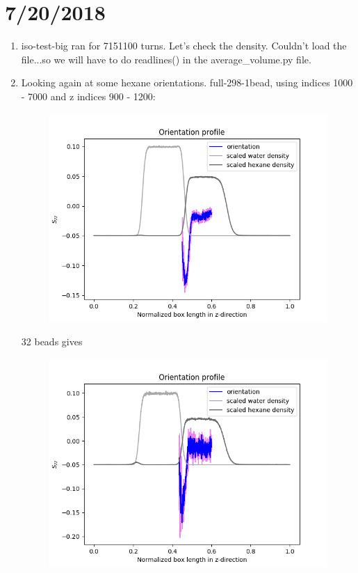 \documentclass[12pt,reqno]{amsart}
\numberwithin{equation}{section}
\begin{document}
\section{7/20/2018}
\begin{enumerate}
\item iso-test-big ran for 7151100 turns.  Let's check the density.  Couldn't load the file...so we will have to do readlines() in the average\_volume.py file.  
\item Looking again at some hexane orientations.  full-298-1bead, using indices 1000 - 7000 and z indices 900 - 1200:
\begin{figure}[H]
\centering
\includegraphics[scale=0.6]{full-298-1bead-interfacial-hexane-orientation}
\end{figure}
32 beads gives
\begin{figure}[H]
\centering
\includegraphics[scale=0.6]{full-298-32bead-interfacial-hexane-orientation}

\end{figure}
\end{enumerate}
\end{document}
